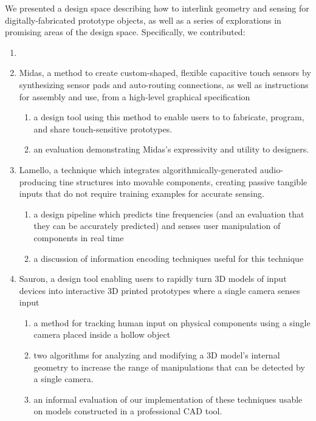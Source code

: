 We presented a design space describing how to interlink geometry and sensing for digitally-fabricated prototype objects, as well as a series of explorations in promising areas of the design space. Specifically, we contributed:
\begin{enumerate}
\item {}
\item Midas, a method to create custom-shaped, flexible capacitive touch sensors by synthesizing sensor pads and auto-routing connections, as well as instructions for assembly and use, from a high-level graphical specification \begin{enumerate}
    \item a design tool using this method to enable users to to fabricate, program, and share touch-sensitive prototypes.
    \item an evaluation demonstrating Midas’s expressivity and utility to designers.
    \end{enumerate}
\item Lamello, a technique which integrates algorithmically-generated audio-producing tine structures into movable components, creating passive tangible inputs that do not require training examples for accurate sensing. \begin{enumerate}
    \item a design pipeline which predicts tine frequencies (and an evaluation that they can be accurately predicted) and senses user manipulation of components in real time
    \item a discussion of information encoding techniques useful for this technique 
    \end{enumerate}
\item Sauron, a design tool enabling users to
rapidly turn 3D models of input devices into interactive 3D printed prototypes where a single camera senses input \begin{enumerate}
    \item a method for tracking human input on physical components using a single camera placed inside a hollow object
    \item two algorithms for analyzing and modifying a 3D model’s internal geometry to increase the range of manipulations that can be detected by a single camera.
    \item an informal evaluation of our implementation of these techniques usable on models constructed in a professional CAD tool.
    \end{enumerate}
\end{enumerate}

